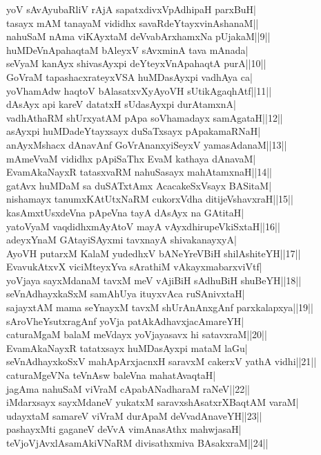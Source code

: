 \documentclass{article}
\begin{document}
yoV sAvAyubaRliV rAjA sapatxdivxVpAdhipaH parxBuH|\\
tasayx mAM  tanayaM vididhx savaRdeYtayxvinAshanaM||\\
nahuSaM nAma viKAyxtaM deVvabArxhamxNa pUjakaM||9||\\
huMDeVnApahaqtaM bAleyxV sAvxminA tava mAnada|\\
seVyaM kanAyx shivasAyxpi deYteyxVnApahaqtA purA||10||\\
GoVraM tapashacxrateyxVSA huMDasAyxpi vadhAya ca|\\
yoVhamAdw haqtoV bAlasatxvXyAyoVH sUtikAgaqhAtf||11||\\
dAsAyx api kareV datatxH sUdasAyxpi durAtamxnA|\\
vadhAthaRM shUrxyatAM pApa soVhamadayx samAgataH||12||\\
asAyxpi huMDadeYtayxsayx duSaTxsayx pApakamaRNaH|\\
anAyxMshacx dAnavAnf GoVrAnanxyiSeyxV yamasAdanaM||13||\\
mAmeVvaM vididhx pApiSaThx EvaM kathaya dAnavaM|\\
EvamAkaNayxR tatasxvaRM nahuSasayx mahAtamxnaH||14||\\
gatAvx huMDaM sa duSATxtAmx AcacakeSxVsayx BASitaM|\\
nishamayx tanumxKAtUtxNaRM cukorxVdha ditijeVshavxraH||15||\\
kasAmxtUsxdeVna pApeVna tayA dAsAyx na GAtitaH|\\
yatoVyaM vaqdidhxmAyAtoV mayA vAyxdhirupeVkiSxtaH||16||\\
adeyxYnaM GAtayiSAyxmi tavxnayA shivakanayxyA|\\
AyoVH putarxM KalaM yudedhxV bANeYreVBiH shilAshiteYH||17||\\
EvavukAtxvX viciMteyxYva sArathiM vAkayxmabarxviVtf|\\
yoVjaya sayxMdanaM tavxM meV vAjiBiH sAdhuBiH shuBeYH||18||\\
seVnAdhayxkaSxM samAhUya ituyxvAca ruSAnivxtaH|\\
sajayxtAM mama seYnayxM tavxM shUrAnAnxgAnf parxkalapxya||19||\\
sAroVheYsutxragAnf yoVja patAkAdhavxjacAmareYH|\\
caturaMgaM balaM meVdayx yoVjayasavx hi satavxraM||20||\\
EvamAkaNayxR tatatxsayx huMDasAyxpi mataM laGu|\\
seVnAdhayxkoSxV mahApArxjacnxH saravxM cakerxV yathA vidhi||21||\\
caturaMgeVNa teVnAsw baleVna mahatAvaqtaH|\\
jagAma nahuSaM viVraM cApabANadharaM raNeV||22||\\
iMdarxsayx sayxMdaneV yukatxM saravxshAsatxrXBaqtAM varaM|\\
udayxtaM samareV viVraM durApaM deVvadAnaveYH||23||\\
pashayxMti gaganeV deVvA vimAnasAthx mahwjasaH|\\
teVjoVjAvxlAsamAkiVNaRM divisathxmiva BAsakxraM||24||\\
\end{document}
